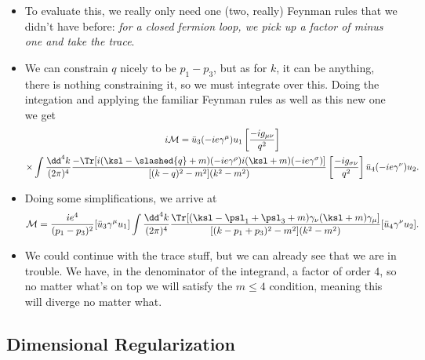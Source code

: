 \begin{itemize}
    \item To evaluate this, we really only need one (two, really) Feynman rules that we didn't have before: \textit{for a closed fermion loop, we pick up a factor of minus one and take the trace}. 
    \item We can constrain $q$ nicely to be $p_1 - p_3$, but as for $k$, it can be anything, there is nothing constraining it, so we must integrate over this. Doing the integation and applying the familiar Feynman rules as well as this new one we get
        \begin{multline*}
            i\mathcal{M} = \bar{u}_3 (-ie\gamma^{\mu})u_1 \left[ \frac{-ig_{\mu\nu}}{q^2} \right] \\ \times \int\frac{\dd^4k}{(2\pi)^4}\frac{-\Tr[i(\ksl - \slashed{q} + m)(-ie\gamma^{\rho})i(\ksl + m)(-ie\gamma^{\sigma})]}{[(k-q)^2 - m^2](k^2 - m^2)} \left[ \frac{-ig_{\sigma\nu}}{q^2} \right]\bar{u}_4(-ie\gamma^{\nu})u_2.
        \end{multline*}
    \item Doing some simplifications, we arrive at
        \begin{equation*}
            \mathcal{M} = \frac{ie^4}{(p_1-p_3)^2}[\bar{u}_3\gamma^{\mu}u_1] \int\frac{\dd^4k}{(2\pi)^4} \frac{\Tr[(\ksl - \psl_{1} + \psl_{3} + m)\gamma_{\nu}(\ksl + m)\gamma_{\mu}]}{[(k - p_1 + p_3)^2 - m^2](k^2 - m^2)}[\bar{u}_4\gamma^{\nu}u_2].
        \end{equation*}
    \item We could continue with the trace stuff, but we can already see that we are in trouble. We have, in the denominator of the integrand, a factor of order $4$, so no matter what's on top we will satisfy the $m\leq4$ condition, meaning this will diverge no matter what.
\end{itemize}





\subsection*{Dimensional Regularization}

